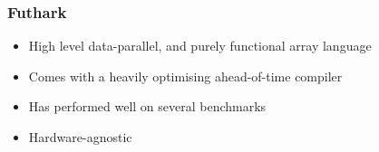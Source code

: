 \documentclass{beamer}
\begin{document}
 \begin{frame}
 \frametitle{Futhark}
 \begin{itemize}
\item{High level data-parallel, and purely functional array language}
\item{Comes with a heavily optimising ahead-of-time compiler}
\item{Has performed well on several benchmarks}
\item{Hardware-agnostic}
\end{itemize}
 \end{frame}

 \begin{frame}
 \nocite{*}
 
 
 \end{frame}
\end{document}
